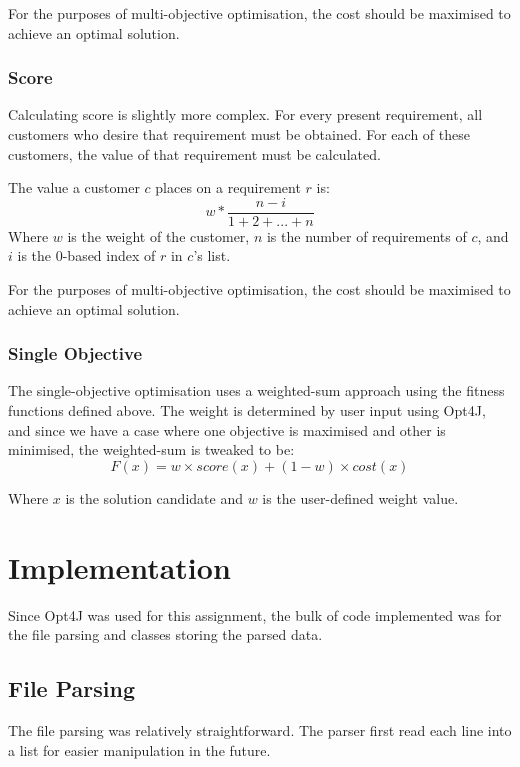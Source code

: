 \documentclass[11pt, a4paper]{article}
\begin{document}
For the purposes of multi-objective optimisation, the cost should be maximised
to achieve an optimal solution.

\subsubsection{Score} %
\label{ssub:score}
Calculating score is slightly more complex. For every present requirement, all
customers who desire that requirement must be obtained. For each of these
customers, the value of that requirement must be calculated.

The value a customer \(c\) places on a requirement \(r\) is:
\[w * \frac{n - i}{1 + 2 + ... + n}\]
Where \(w\) is the weight of the customer, \(n\) is the number of requirements
of \(c\), and \(i\) is the 0-based index of \(r\) in \(c\)'s list.

For the purposes of multi-objective optimisation, the cost should be maximised
to achieve an optimal solution.

\subsubsection{Single Objective} %
\label{ssub:single_objective}
The single-objective optimisation uses a weighted-sum approach using the fitness
functions defined above. The weight is determined by user input using Opt4J, and
since we have a case where one objective is maximised and other is minimised,
the weighted-sum is tweaked to be:
\[F(x) = w \times score(x) + (1 - w) \times cost(x)\]

Where \(x\) is the solution candidate and \(w\) is the user-defined weight
value.

\section{Implementation}
\label{sec:implementation}
Since Opt4J was used for this assignment, the bulk of code implemented was for
the file parsing and classes storing the parsed data.
\subsection{File Parsing} %
\label{sub:file_parsing}
The file parsing was relatively straightforward. The parser first read each line
into a list for easier manipulation in the future.
\end{document}
